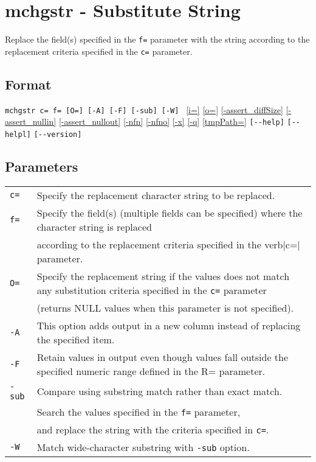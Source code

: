 
%

\section{mchgstr - Substitute String\label{sect:mchgstr}}
Replace the field(s) specified in the \verb|f=| parameter with the string according to the replacement criteria specified in the \verb|c=| parameter.

\subsection*{Format}
\verb|mchgstr c= f= [O=] [-A] [-F] [-sub] [-W] |    
\hyperref[sect:option_i]{[i=]}
\hyperref[sect:option_o]{[o=]}
\hyperref[sect:option_assert_diffSize]{[-assert\_diffSize]}
\hyperref[sect:option_assert_nullin]{[-assert\_nullin]}
\hyperref[sect:option_assert_nullout]{[-assert\_nullout]}
\hyperref[sect:option_nfn]{[-nfn]} 
\hyperref[sect:option_nfno]{[-nfno]}  
\hyperref[sect:option_x]{[-x]}
\hyperref[sect:option_q]{[-q]}
\hyperref[sect:option_option_tmppath]{[tmpPath=]}
\verb|[--help]|
\verb|[--helpl]|
\verb|[--version]|\\

\subsection*{Parameters}
\begin{table}[htbp]
{\small
\begin{tabular}{ll}
\verb|c=|    & Specify the replacement character string to be replaced.\\
\verb|f=|    & Specify the field(s) (multiple fields can be specified) where the character string is replaced \\
		& according to the replacement criteria specified in the verb|c=| parameter.\\
\verb|O=|    & Specify the replacement string if the values does not match any substitution criteria specified in the \verb|c=| parameter \\
		& (returns NULL values when this parameter is not specified).\\
\verb|-A|    & This option adds output in a new column instead of replacing the specified item. \\
\verb|-F|    & Retain values in output even though values fall outside the specified numeric range defined in the R= parameter.  \\
\verb|-sub|  & Compare using substring match rather than exact match. \\
		& Search the values specified in the \verb|f=| parameter, \\
		& and replace the string with the criteria specified in \verb|c=|. \\
\verb|-W|    & Match wide-character substring with \verb|-sub| option.\\
\end{tabular} 
}
\end{table} 

